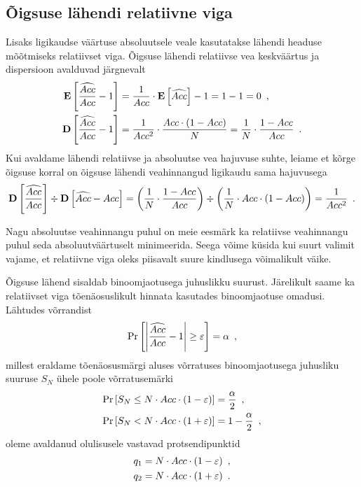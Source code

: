 \subsection{Õigsuse lähendi relatiivne viga}
Lisaks ligikaudse väärtuse absoluutsele veale kasutatakse lähendi headuse mõõtmiseks relatiivset viga. Õigsuse lähendi relatiivse vea keskväärtus ja dispersioon avalduvad järgnevalt
\begin{align*}
    \operatorname*{\mathbf{E}}\left[\frac{\widehat{Acc}}{Acc} - 1\right] &= \frac{1}{Acc} \cdot \operatorname*{\mathbf{E}}\left[\widehat{Acc}\right] - 1 = 1 - 1 = 0 \nonumber \enspace, \\
    \operatorname*{\mathbf{D}}\left[\frac{\widehat{Acc}}{Acc} - 1\right] &= \frac{1}{Acc^2} \cdot \frac{Acc \cdot (1 - Acc)}{N} = \frac{1}{N} \cdot \frac{1 - Acc}{Acc} \enspace.
\end{align*}
Kui avaldame lähendi relatiivse ja absoluutse vea hajuvuse suhte, leiame et kõrge õigsuse korral on õigsuse lähendi veahinnangud ligikaudu sama hajuvusega
\begin{equation*}
    \operatorname*{\mathbf{D}}\left[\frac{\widehat{Acc}}{Acc}\right] \div \operatorname*{\mathbf{D}}\left[\widehat{Acc} - Acc\right] =
    \left( \frac{1}{N} \cdot \frac{1 - Acc}{Acc} \right) \div \left( \frac{1}{N} \cdot Acc \cdot (1 - Acc) \right) = \frac{1}{Acc^2} \enspace.
\end{equation*}

Nagu absoluutse veahinnangu puhul on meie eesmärk ka relatiivse veahinnangu puhul seda absoluutväärtuselt minimeerida. Seega võime küsida kui suurt valimit vajame, et relatiivne viga oleks piisavalt suure kindlusega võimalikult väike.

Õigsuse lähend sisaldab binoomjaotusega juhuslikku suurust. Järelikult saame ka relatiivset viga tõenäosuslikult hinnata kasutades binoomjaotuse omadusi. Lähtudes võrrandist
\begin{equation}
    \label{eq:binoomjaotus relatiivne viga}
    \Pr\left[\left| \frac{\widehat{Acc}}{Acc} - 1 \right| \geq \varepsilon\right] = \alpha \enspace,
\end{equation}
millest eraldame tõenäosusmärgi aluses võrratuses binoomjaotusega juhusliku suuruse $S_N$ ühele poole võrratusemärki
\begin{align*}
    \Pr\left[S_N \leq N \cdot Acc \cdot (1-\varepsilon)\right] &= \frac{\alpha}{2} \enspace, \\
    \Pr\left[S_N <    N \cdot Acc \cdot (1+\varepsilon)\right] &= 1 - \frac{\alpha}{2} \enspace,
\end{align*}
oleme avaldanud olulisusele vastavad protsendipunktid
\begin{align*}
    q_1 &= N \cdot Acc \cdot (1-\varepsilon) \enspace, \\
    q_2 &= N \cdot Acc \cdot (1+\varepsilon) \enspace.
\end{align*}

